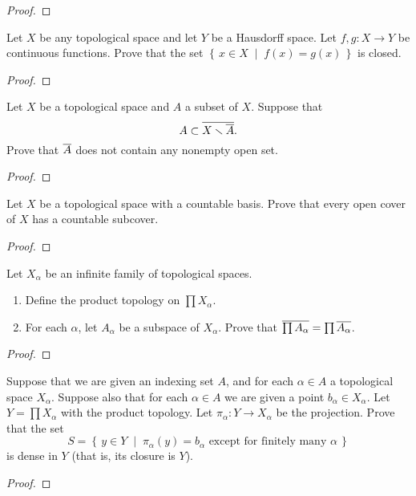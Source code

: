 \begin{proof}
\end{proof}
\begin{problem}
Let $X$ be any topological space and let $Y$ be a Hausdorff
space. Let $f,g\colon X\to Y$ be continuous functions. Prove that
the set $\left\{\,x\in X\;\middle|\;f(x)=g(x)\,\right\}$ is
closed.
\end{problem}
\begin{proof}
\end{proof}
\begin{problem}
Let $X$ be a topological space and $A$ a subset of $X$. Suppose that
\[
A\subset\overline{X\smallsetminus\overline{A}}.
\]
Prove that $\overline{A}$ does not contain any nonempty open set.
\end{problem}
\begin{proof}
\end{proof}
\begin{problem}
Let $X$ be a topological space with a countable basis. Prove that
every open cover of $X$ has a countable subcover.
\end{problem}
\begin{proof}
\end{proof}
\begin{problem}
Let $X_\alpha$ be an infinite family of topological spaces.
\begin{enumerate}[noitemsep,label=(\alph*)]
\item Define the product topology on $\prod X_\alpha$.
\item For each $\alpha$, let $A_\alpha$ be a subspace of
  $X_\alpha$. Prove that $\overline{\prod
    A_\alpha}=\prod\overline{A_\alpha}$.
\end{enumerate}
\end{problem}
\begin{proof}
\end{proof}
\begin{problem}
Suppose that we are given an indexing set $A$, and for each
$\alpha\in A$ a topological space $X_\alpha$. Suppose also that
for each $\alpha\in A$ we are given a point $b_\alpha\in
X_\alpha$. Let $Y=\prod X_\alpha$ with the product topology. Let
$\pi_\alpha\colon Y\to X_\alpha$ be the projection. Prove that
the set
\[
S=\left\{\,y\in Y\;\middle|\;\text{$\pi_\alpha(y)=b_\alpha$ except for
    finitely many $\alpha$}\,\right\}
\]
is dense in $Y$ (that is, its closure is $Y$).
\end{problem}
\begin{proof}
\end{proof}
